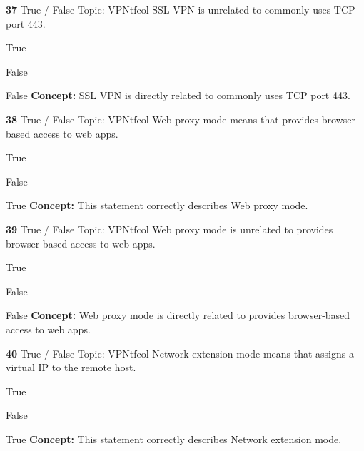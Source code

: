 \documentclass[10pt,a4paper]{article}
\begin{document}
\begin{qcard}{\color{white}\textbf{37} \hfill \small True / False \textbar{} Topic: VPN}{tfcol}
SSL VPN is unrelated to commonly uses TCP port 443.

\begin{qoptions}
\item True
\item False
\end{qoptions}
\begin{explainbox}{False}
\textbf{Concept:} SSL VPN is directly related to commonly uses TCP port 443.
\end{explainbox}
\end{qcard}

\begin{qcard}{\color{white}\textbf{38} \hfill \small True / False \textbar{} Topic: VPN}{tfcol}
Web proxy mode means that provides browser-based access to web apps.

\begin{qoptions}
\item True
\item False
\end{qoptions}
\begin{explainbox}{True}
\textbf{Concept:} This statement correctly describes Web proxy mode.
\end{explainbox}
\end{qcard}

\begin{qcard}{\color{white}\textbf{39} \hfill \small True / False \textbar{} Topic: VPN}{tfcol}
Web proxy mode is unrelated to provides browser-based access to web apps.

\begin{qoptions}
\item True
\item False
\end{qoptions}
\begin{explainbox}{False}
\textbf{Concept:} Web proxy mode is directly related to provides browser-based access to web apps.
\end{explainbox}
\end{qcard}

\begin{qcard}{\color{white}\textbf{40} \hfill \small True / False \textbar{} Topic: VPN}{tfcol}
Network extension mode means that assigns a virtual IP to the remote host.

\begin{qoptions}
\item True
\item False
\end{qoptions}
\begin{explainbox}{True}
\textbf{Concept:} This statement correctly describes Network extension mode.
\end{explainbox}
\end{qcard}
\end{document}
